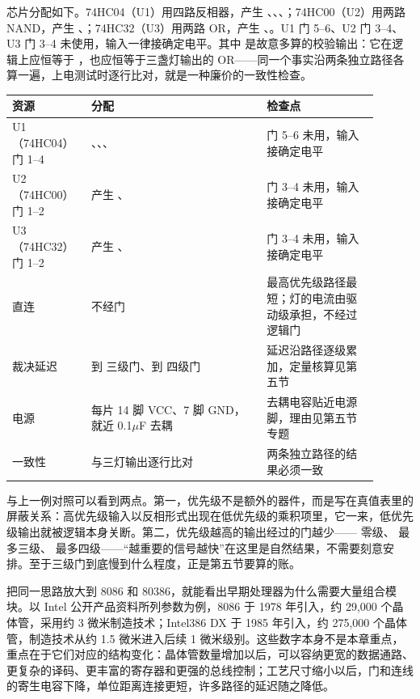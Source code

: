 芯片分配如下。74HC04（U1）用四路反相器，产生 、、、；74HC00（U2）用两路 NAND，产生 、；74HC32（U3）用两路 OR，产生 、。U1 门 5–6、U2 门 3–4、U3 门 3–4 未使用，输入一律接确定电平。其中  是故意多算的校验输出：它在逻辑上应恒等于 ，也应恒等于三盏灯输出的 OR——同一个事实沿两条独立路径各算一遍，上电测试时逐行比对，就是一种廉价的一致性检查。

\begin{longtable}{L{0.18\linewidth}L{0.44\linewidth}L{0.28\linewidth}}
\toprule
资源 & 分配 & 检查点 \\
\midrule
U1（74HC04）门 1–4 & 、、、 & 门 5–6 未用，输入接确定电平 \\
U2（74HC00）门 1–2 & 产生 、 & 门 3–4 未用，输入接确定电平 \\
U3（74HC32）门 1–2 & 产生 、 & 门 3–4 未用，输入接确定电平 \\
 直连 &  不经门 & 最高优先级路径最短；灯的电流由驱动级承担，不经过逻辑门 \\
裁决延迟 &  到  三级门、到  四级门 & 延迟沿路径逐级累加，定量核算见第五节 \\
电源 & 每片 14 脚 VCC、7 脚 GND，就近 0.1$\mu$F 去耦 & 去耦电容贴近电源脚，理由见第五节专题 \\
一致性 &  与三灯输出逐行比对 & 两条独立路径的结果必须一致 \\
\bottomrule
\end{longtable}

与上一例对照可以看到两点。第一，优先级不是额外的器件，而是写在真值表里的屏蔽关系：高优先级输入以反相形式出现在低优先级的乘积项里，它一来，低优先级输出就被逻辑本身关断。第二，优先级越高的输出经过的门越少—— 零级、 最多三级、 最多四级——“越重要的信号越快”在这里是自然结果，不需要刻意安排。至于三级门到底慢到什么程度，正是第五节要算的账。

把同一思路放大到 8086 和 80386，就能看出早期处理器为什么需要大量组合模块。以 Intel 公开产品资料所列参数为例，8086 于 1978 年引入，约 29,000 个晶体管，采用约 3 微米制造技术；Intel386 DX 于 1985 年引入，约 275,000 个晶体管，制造技术从约 1.5 微米进入后续 1 微米级别。这些数字本身不是本章重点，重点在于它们对应的结构变化：晶体管数量增加以后，可以容纳更宽的数据通路、更复杂的译码、更丰富的寄存器和更强的总线控制；工艺尺寸缩小以后，门和连线的寄生电容下降，单位距离连接更短，许多路径的延迟随之降低。

